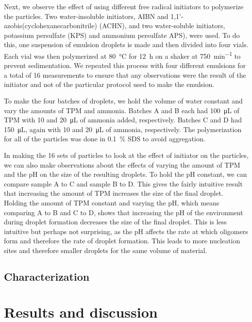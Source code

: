 Next, we observe the effect of using different free radical initiators 
to polymerize the particles. Two water-insoluble initiators, AIBN and
\num{1},\num{1}'-azobis(cyclohexanecarbonitrile) (ACHN), and two water-soluble 
initiators, potassium persulfate (KPS) and ammonium persulfate APS), were 
used. To do this, one suspension of emulsion droplets is made and then 
divided into four vials. Each vial was then polymerized at \SI{80}{\celsius} 
for \SI{12}{\hour} on a shaker at \SI{750}{\minute^{-1}} %
to prevent sedimentation. 
We repeated this process with four different emulsions for a total of 
\num{16} measurements to ensure that any observations were the result of the 
initiator and not of the particular protocol used to make the emulsion.

To make the four batches of droplets, we hold the volume of water constant 
and vary the amounts of TPM and ammonia. Batches A and B each had 
\SI{100}{\micro\liter} of TPM with \si{10} and \SI{20}{\micro\liter} of 
ammonia added, respectively. Batches C and D had \SI{150}{\micro\liter}, 
again with \si{10} and \SI{20}{\micro\liter} of ammonia, respectively. 
The polymerization for all of the particles was done in \SI{0.1}{\percent} 
SDS to avoid aggregation. 

In making the \si{16} sets of particles to look at the effect of initiator on 
the particles, we can also make observations about the effects of varying 
the amount of TPM and the pH on the size of the resulting droplets. To hold 
the pH constant, we can compare sample A to C and sample B to D. This gives 
the fairly intuitive result that increasing the amount of TPM increases the 
size of the final droplet. Holding the amount of TPM constant and varying 
the pH, which means comparing A to B and C to D, shows that increasing the 
pH of the environment during droplet formation decreases the size of the 
final droplet. This is less intuitive but perhaps not surprising, as the pH 
affects the rate at which oligomers form and therefore the rate of droplet 
formation. This leads to more nucleation sites and therefore smaller droplets 
for the same volume of material. 

\subsection{Characterization}

\section{Results and discussion}
